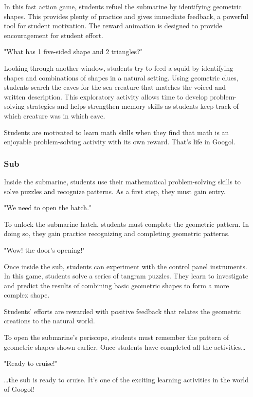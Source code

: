 In this fast action game, students refuel the submarine by identifying geometric shapes.
This provides plenty of practice and gives immediate feedback, a powerful tool for student motivation.
The reward animation is designed to provide encouragement for student effort.

"What has 1 five-sided shape and 2 triangles?"

Looking through another window, students try to feed a squid by identifying shapes and combinations of shapes in a natural setting.
Using geometric clues, students search the caves for the sea creature that matches the voiced and written description.
This exploratory activity allows time to develop problem-solving strategies and helps strengthen memory skills as students keep track of which creature was in which cave.

Students are motivated to learn math skills when they find that math is an enjoyable problem-solving activity with its own reward.
That's life in Googol.

\subsubsection{Sub}

Inside the submarine, students use their mathematical problem-solving skills to solve puzzles and recognize patterns.
As a first step, they must gain entry.

"We need to open the hatch."

To unlock the submarine hatch, students must complete the geometric pattern.
In doing so, they gain practice recognizing and completing geometric patterns.

"Wow! the door's opening!"

Once inside the sub, students can experiment with the control panel instruments.
In this game, students solve a series of tangram puzzles.
They learn to investigate and predict the results of combining basic geometric shapes to form a more complex shape.

Students' efforts are rewarded with positive feedback that relates the geometric creations to the natural world.

To open the submarine's periscope, students must remember the pattern of geometric shapes shown earlier.
Once students have completed all the activities\dots

"Ready to cruise!"

\dots the sub is ready to cruise.
It's one of the exciting learning activities in the world of Googol!

